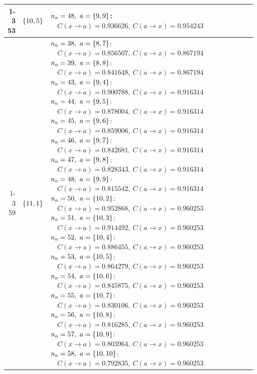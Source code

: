 \begin{longtable}{@{}r l >{\raggedright\arraybackslash}p{}@{}}
  \cmidrule(lr){1-3}
  53 & \(\left\{10,5\right\}\) & \(n_a=48,\ a=\sig{9,9}\):\newline \(\quad C(x\!\to\!a)=0.936626,\ C(a\!\to\!x)=0.954243\) \\
  \cmidrule(lr){1-3}
  59 & \(\left\{11,1\right\}\) & \(n_a=38,\ a=\sig{8,7}\):\newline \(\quad C(x\!\to\!a)=0.856507,\ C(a\!\to\!x)=0.867194\)\newline \(n_a=39,\ a=\sig{8,8}\):\newline \(\quad C(x\!\to\!a)=0.841648,\ C(a\!\to\!x)=0.867194\)\newline \(n_a=43,\ a=\sig{9,4}\):\newline \(\quad C(x\!\to\!a)=0.900788,\ C(a\!\to\!x)=0.916314\)\newline \(n_a=44,\ a=\sig{9,5}\):\newline \(\quad C(x\!\to\!a)=0.878004,\ C(a\!\to\!x)=0.916314\)\newline \(n_a=45,\ a=\sig{9,6}\):\newline \(\quad C(x\!\to\!a)=0.859006,\ C(a\!\to\!x)=0.916314\)\newline \(n_a=46,\ a=\sig{9,7}\):\newline \(\quad C(x\!\to\!a)=0.842681,\ C(a\!\to\!x)=0.916314\)\newline \(n_a=47,\ a=\sig{9,8}\):\newline \(\quad C(x\!\to\!a)=0.828343,\ C(a\!\to\!x)=0.916314\)\newline \(n_a=48,\ a=\sig{9,9}\):\newline \(\quad C(x\!\to\!a)=0.815542,\ C(a\!\to\!x)=0.916314\)\newline \(n_a=50,\ a=\sig{10,2}\):\newline \(\quad C(x\!\to\!a)=0.952868,\ C(a\!\to\!x)=0.960253\)\newline \(n_a=51,\ a=\sig{10,3}\):\newline \(\quad C(x\!\to\!a)=0.914492,\ C(a\!\to\!x)=0.960253\)\newline \(n_a=52,\ a=\sig{10,4}\):\newline \(\quad C(x\!\to\!a)=0.886455,\ C(a\!\to\!x)=0.960253\)\newline \(n_a=53,\ a=\sig{10,5}\):\newline \(\quad C(x\!\to\!a)=0.864279,\ C(a\!\to\!x)=0.960253\)\newline \(n_a=54,\ a=\sig{10,6}\):\newline \(\quad C(x\!\to\!a)=0.845875,\ C(a\!\to\!x)=0.960253\)\newline \(n_a=55,\ a=\sig{10,7}\):\newline \(\quad C(x\!\to\!a)=0.830106,\ C(a\!\to\!x)=0.960253\)\newline \(n_a=56,\ a=\sig{10,8}\):\newline \(\quad C(x\!\to\!a)=0.816285,\ C(a\!\to\!x)=0.960253\)\newline \(n_a=57,\ a=\sig{10,9}\):\newline \(\quad C(x\!\to\!a)=0.803964,\ C(a\!\to\!x)=0.960253\)\newline \(n_a=58,\ a=\sig{10,10}\):\newline \(\quad C(x\!\to\!a)=0.792835,\ C(a\!\to\!x)=0.960253\) \\

\end{longtable}
